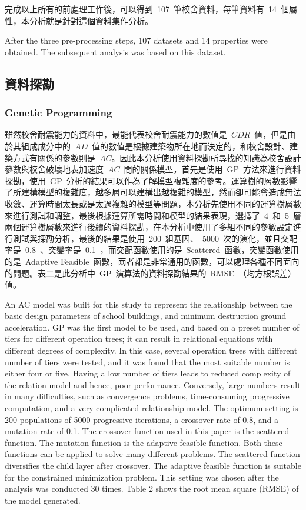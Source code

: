 完成以上所有的前處理工作後，可以得到~107~筆校舍資料，每筆資料有~14~個屬性，本分析就是針對這個資料集作分析。

After the three pre-processing steps, 107 datasets and 14 properties were obtained. The subsequent analysis was based on this dataset.

\subsection{資料探勘}

\subsubsection{Genetic Programming}

雖然校舍耐震能力的資料中，最能代表校舍耐震能力的數值是~$CDR$~值，但是由於其組成成分中的~$AD$~值的數值是根據建築物所在地而決定的，和校舍設計、建築方式有關係的參數則是~$AC$。因此本分析使用資料探勘所尋找的知識為校舍設計參數與校舍破壞地表加速度~$AC$~間的關係模型，首先是使用~GP~方法來進行資料探勘，使用~GP~分析的結果可以作為了解模型複雜度的參考。運算樹的層數影響了所建構模型的複雜度，越多層可以建構出越複雜的模型，然而卻可能會造成無法收斂、運算時間太長或是太過複雜的模型等問題，本分析先使用不同的運算樹層數來進行測試和調整，最後根據運算所需時間和模型的結果表現，選擇了~4~和~5~層兩個運算樹層數來進行後續的資料探勘，在本分析中使用了多組不同的參數設定進行測試與探勘分析，最後的結果是使用~200~組基因、~5000~次的演化，並且交配率是~0.8~、突變率是~0.1~，而交配函數使用的是~Scattered~函數，突變函數使用的是~Adaptive Feasible~函數，兩者都是非常通用的函數，可以處理各種不同面向的問題。表二是此分析中~GP~演算法的資料探勘結果的~RMSE~（均方根誤差）值。

An AC model was built for this study to represent the relationship between the basic design parameters of school buildings, and minimum destruction ground acceleration. GP was the first model to be used, and based on a preset number of tiers for different operation trees; it can result in relational equations with different degrees of complexity. In this case, several operation trees with different number of tiers were tested, and it was found that the most suitable number is either four or five. Having a low number of tiers leads to reduced complexity of the relation model and hence, poor performance. Conversely, large numbers result in many difficulties, such as convergence problems, time-consuming progressive computation, and a very complicated relationship model. The optimum setting is 200 populations of 5000 progressive iterations, a crossover rate of 0.8, and a mutation rate of 0.1. The crossover function used in this paper is the scattered function. The mutation function is the adaptive feasible function. Both these functions can be applied to solve many different problems. The scattered function diversifies the child layer after crossover. The adaptive feasible function is suitable for the constrained minimization problem. This setting was chosen after the analysis was conducted 30 times. Table 2 shows the root mean square (RMSE) of the model generated.

